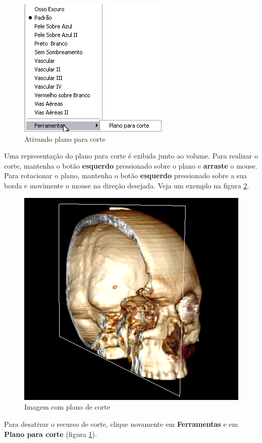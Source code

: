 \begin{figure}[!htb]
\centering
\includegraphics[scale=0.6]{../user_guide_figures/invesalius_screen/activate_cut_plane_pt.png}
\caption{Ativando plano para corte}
\label{fig:activate_cut_plane}
\end{figure}

Uma representação do plano para corte é exibida junto ao volume. Para realizar o corte,
mantenha o botão \textbf{esquerdo} pressionado sobre o plano e \textbf{arraste} o mouse.
Para rotacionar o plano, mantenha o botão \textbf{esquerdo} pressionado sobre a sua borda
e movimente o mouse na direção desejada. Veja um exemplo na figura \ref{fig:cutted_image}.

\begin{figure}[!htb]
\centering
\includegraphics[scale=0.6]{../user_guide_figures/invesalius_screen/cutted_image.png}
\caption{Imagem com plano de corte}
\label{fig:cutted_image}
\end{figure}

Para desativar o recurso de corte, clique novamente em \textbf{Ferramentas} e em
\textbf{Plano para corte} (figura \ref{fig:activate_cut_plane}).
